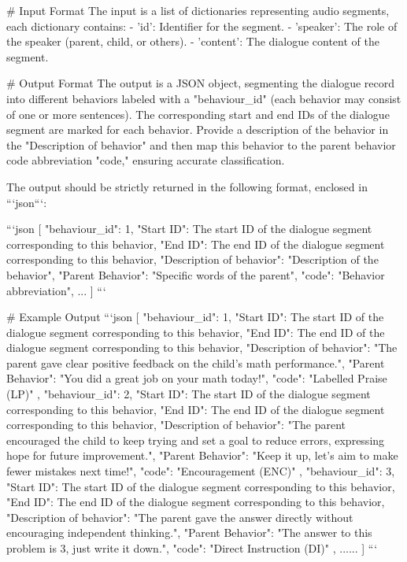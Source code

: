 \begin{spverbatim}
# Input Format
The input is a list of dictionaries representing audio segments, each dictionary contains:
- 'id': Identifier for the segment.
- 'speaker': The role of the speaker (parent, child, or others).
- 'content': The dialogue content of the segment.

# Output Format
The output is a JSON object, segmenting the dialogue record into different behaviors labeled with a "behaviour_id" (each behavior may consist of one or more sentences). The corresponding start and end IDs of the dialogue segment are marked for each behavior. Provide a description of the behavior in the "Description of behavior" and then map this behavior to the parent behavior code abbreviation "code," ensuring accurate classification.

The output should be strictly returned in the following format, enclosed in ```json```:

```json
[
    {
        "behaviour_id": 1,
        "Start ID": The start ID of the dialogue segment corresponding to this behavior,
        "End ID": The end ID of the dialogue segment corresponding to this behavior,
        "Description of behavior": "Description of the behavior",
        "Parent Behavior": "Specific words of the parent",
        "code": "Behavior abbreviation",
    }
    ...
]
```

# Example Output
```json
[
    {
        "behaviour_id": 1,
        "Start ID": The start ID of the dialogue segment corresponding to this behavior,
        "End ID": The end ID of the dialogue segment corresponding to this behavior,
        "Description of behavior": "The parent gave clear positive feedback on the child’s math performance.",
        "Parent Behavior": "You did a great job on your math today!",
        "code": "Labelled Praise (LP)"
    },
    {
        "behaviour_id": 2,
        "Start ID": The start ID of the dialogue segment corresponding to this behavior,
        "End ID": The end ID of the dialogue segment corresponding to this behavior,
        "Description of behavior": "The parent encouraged the child to keep trying and set a goal to reduce errors, expressing hope for future improvement.",
        "Parent Behavior": "Keep it up, let’s aim to make fewer mistakes next time!",
        "code": "Encouragement (ENC)"
    },
    {
        "behaviour_id": 3,
        "Start ID": The start ID of the dialogue segment corresponding to this behavior,
        "End ID": The end ID of the dialogue segment corresponding to this behavior,
        "Description of behavior": "The parent gave the answer directly without encouraging independent thinking.",
        "Parent Behavior": "The answer to this problem is 3, just write it down.",
        "code": "Direct Instruction (DI)"
    },
......
]
```
\end{spverbatim}
